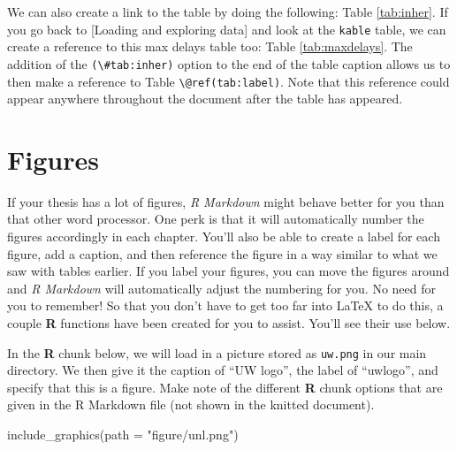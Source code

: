 \documentclass[print]{nuthesis}
\newenvironment{Shaded}{\begin{snugshade}}{\end{snugshade}}
\newcommand{\AttributeTok}[1]{\textcolor[rgb]{0.77,0.63,0.00}{#1}}
\newcommand{\FunctionTok}[1]{\textcolor[rgb]{0.00,0.00,0.00}{#1}}
\newcommand{\NormalTok}[1]{#1}
\newcommand{\StringTok}[1]{\textcolor[rgb]{0.31,0.60,0.02}{#1}}
\begin{document}
We can also create a link to the table by doing the following: Table \ref{tab:inher}. If you go back to {[}Loading and exploring data{]} and look at the \texttt{kable} table, we can create a reference to this max delays table too: Table \ref{tab:maxdelays}. The addition of the \texttt{(\textbackslash{}\#tab:inher)} option to the end of the table caption allows us to then make a reference to Table \texttt{\textbackslash{}@ref(tab:label)}. Note that this reference could appear anywhere throughout the document after the table has appeared.

\clearpage

\hypertarget{figures}{%
\section{Figures}\label{figures}}

If your thesis has a lot of figures, \emph{R Markdown} might behave better for you than that other word processor. One perk is that it will automatically number the figures accordingly in each chapter. You'll also be able to create a label for each figure, add a caption, and then reference the figure in a way similar to what we saw with tables earlier. If you label your figures, you can move the figures around and \emph{R Markdown} will automatically adjust the numbering for you. No need for you to remember! So that you don't have to get too far into LaTeX to do this, a couple \textbf{R} functions have been created for you to assist. You'll see their use below.

In the \textbf{R} chunk below, we will load in a picture stored as \texttt{uw.png} in our main directory. We then give it the caption of ``UW logo'', the label of ``uwlogo'', and specify that this is a figure. Make note of the different \textbf{R} chunk options that are given in the R Markdown file (not shown in the knitted document).

\begin{Shaded}
\begin{Highlighting}[]
\FunctionTok{include\_graphics}\NormalTok{(}\AttributeTok{path =} \StringTok{"figure/unl.png"}\NormalTok{)}
\end{Highlighting}
\end{Shaded}
\end{document}
